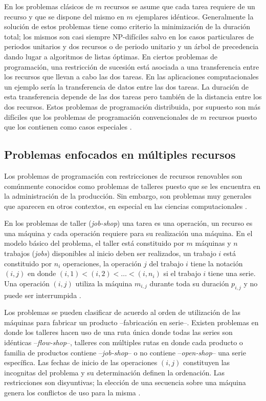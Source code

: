 \documentclass[spanish,draft,12pt,headsepline,footsepline,paper=letter]{scrreprt}
\begin{document}
En los problemas clásicos de $m$ recursos se asume que cada tarea requiere de un recurso y que se dispone del mismo en $m$ ejemplares idénticos. Generalmente la solución de estos problemas tiene como criterio la minimización de la duración total; los mismos son casi siempre NP-difíciles salvo en los casos particulares de periodos unitarios y dos recursos o de periodo unitario y un árbol de precedencia dando lugar a algoritmos de listas óptimas. En ciertos problemas de programación, una restricción de sucesión está asociada a una transferencia entre los recursos que llevan a cabo las dos tareas. En las aplicaciones computacionales un ejemplo sería la transferencia de datos entre las dos tareas. La duración de esta transferencia depende de las dos tareas pero también de la distancia entre los dos recursos. Estos problemas de programación distribuida, por supuesto son más difíciles que los problemas de programación convencionales de $m$ recursos puesto que los contienen como casos especiales \citep[p.~99]{gotha93les-problemes-dordonnancement}.

\subsection{Problemas enfocados en múltiples recursos}
\label{problemas_enfocados_multiples_recursos}

Los problemas de programación con restricciones de recursos renovables son comúnmente conocidos como problemas de talleres puesto que se les encuentra en la administración de la producción. Sin embargo, son problemas muy generales que aparecen en otros contextos, en especial en las ciencias computacionales \citep[p.~101]{gotha93les-problemes-dordonnancement}.

En los problemas de taller (\textit{job-shop}) una tarea es una operación, un recurso es una máquina y cada operación requiere para su realización una máquina. En el modelo básico del problema, el taller está constituido por $m$ máquinas y $n$ trabajos (\textit{jobs}) disponibles al inicio deben ser realizados, un trabajo $i$ está constituido por $n_i$ operaciones, la operación $j$ del trabajo $i$ tiene la notación $(i,j)$ en donde $(i,1)<(i,2)<\dots<(i,n_i)$ si el trabajo $i$ tiene una serie. Una operación $(i,j)$ utiliza la máquina $m_{i,j}$ durante toda su duración $p_{i,j}$ y no puede ser interrumpida \citep[p.~102]{gotha93les-problemes-dordonnancement}.

Los problemas se pueden clasificar de acuerdo al orden de utilización de las máquinas para fabricar un producto –fabricación en serie–. Existen problemas en donde los talleres hacen uso de una ruta única donde todas las series son idénticas –\textit{flow-shop}–, talleres con múltiples rutas en donde cada producto o familia de productos contiene –\textit{job-shop}– o no contiene –\textit{open-shop}– una serie específica. Las fechas de inicio de las operaciones $(i,j)$ constituyen las incognitas del problema y su determinación definen la ordenación. Las restricciones son disyuntivas; la elección de una secuencia sobre una máquina genera los conflictos de uso para la misma \citep[p.~102]{gotha93les-problemes-dordonnancement}.
\end{document}
